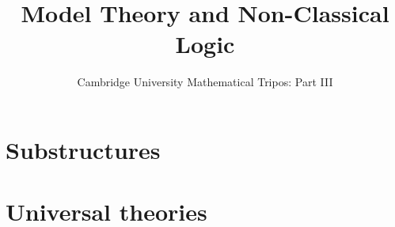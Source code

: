 \documentclass{article}
\title{Model Theory and Non-Classical Logic}
\author{Cambridge University Mathematical Tripos: Part III}
\begin{document}
\maketitle

\tableofcontentsnewpage{}

\section{Substructures}

\section{Universal theories}

\end{document}
